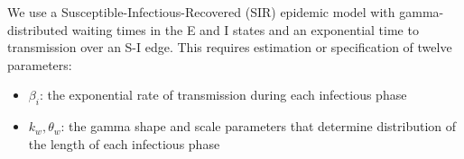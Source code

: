 We use a Susceptible-Infectious-Recovered (SIR) epidemic model with gamma-distributed waiting times in the E and I states and an exponential time to transmission over an S-I edge. This requires estimation or specification of twelve parameters:
\begin{itemize}
\item $\beta_i$: the exponential rate of transmission during each infectious phase
\item $k_w, \theta_w$: the gamma shape and scale parameters that determine distribution of the length of each infectious phase
\end{itemize}

